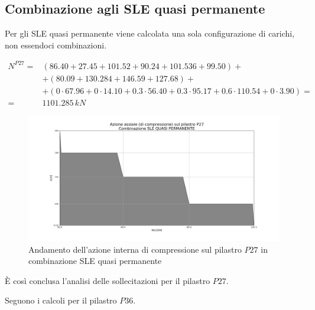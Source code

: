 \subsection{Combinazione agli SLE quasi permanente}
Per gli SLE quasi permanente viene calcolata una sola configurazione di carichi, non essendoci combinazioni.

\begin{align*}
	N^{P27} =& (86.40+27.45+101.52+90.24+101.536+99.50)+\\
	&+(80.09+130.284+146.59+127.68)+\\	&+(0\cdot67.96+0\cdot14.10+0.3\cdot56.40+0.3\cdot95.17+0.6\cdot110.54+0\cdot3.90) =\\
	=& 1101.285\,kN
\end{align*}


\begin{figure}
	\centering
	\includegraphics[width=.8\textwidth]{../../export/img/P27_axialLoad_sleQP}
	\caption{Andamento dell'azione interna di compressione sul pilastro $P27$ in combinazione SLE quasi permanente}
	\label{fig:P27axialLoad_sleQP}
\end{figure}

È così conclusa l'analisi delle sollecitazioni per il pilastro $P27$. 

Seguono i calcoli per il pilastro $P36$.
\cleardoublepage

